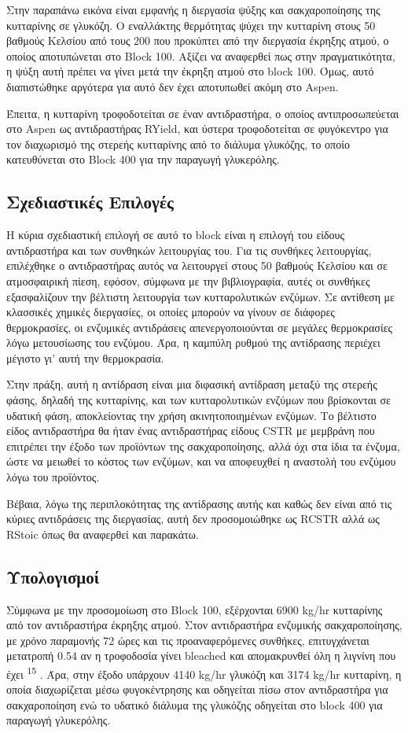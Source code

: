 \documentclass[11pt]{article}
\makeatletter
\newcommand{\citeprocitem}[2]{\hyper@linkstart{cite}{citeproc_bib_item_#1}#2\hyper@linkend}
\makeatother
\begin{document}
Στην παραπάνω εικόνα είναι εμφανής η διεργασία ψύξης και σακχαροποίησης
της κυτταρίνης σε γλυκόζη. Ο εναλλάκτης θερμότητας ψύχει την κυτταρίνη
στους 50 βαθμούς Κελσίου από τους 200 που προκύπτει από την διεργασία
έκρηξης ατμού, ο οποίος αποτυπώνεται στο Block 100. Αξίζει να αναφερθεί πως στην πραγματικότητα, η ψύξη αυτή πρέπει να γίνει μετά την έκρηξη ατμού στο block 100. Όμως, αυτό διαπιστώθηκε αργότερα για αυτό δεν έχει αποτυπωθεί ακόμη στο Aspen.

Έπειτα, η κυτταρίνη τροφοδοτείται σε έναν αντιδραστήρα, ο οποίος αντιπροσωπεύεται στο Aspen ως αντιδραστήρας RYield, και ύστερα τροφοδοτείται σε φυγόκεντρο για τον
διαχωρισμό της στερεής κυτταρίνης από το διάλυμα γλυκόζης, το οποίο
κατευθύνεται στο Block 400 για την παραγωγή γλυκερόλης.

\subsection{Σχεδιαστικές Επιλογές}
\label{sec:orgb4f5268}
Η κύρια σχεδιαστική επιλογή σε αυτό το block είναι η επιλογή του είδους
αντιδραστήρα και των συνθηκών λειτουργίας του. Για τις συνθήκες
λειτουργίας, επιλέχθηκε ο αντιδραστήρας αυτός να λειτουργεί στους 50
βαθμούς Κελσίου και σε ατμοσφαιρική πίεση, εφόσον, σύμφωνα με την
βιβλιογραφία, αυτές οι συνθήκες εξασφαλίζουν την βέλτιστη λειτουργία των
κυτταρολυτικών ενζύμων. Σε αντίθεση με κλασσικές χημικές διεργασίες, οι
οποίες μπορούν να γίνουν σε διάφορες θερμοκρασίες, οι ενζυμικές
αντιδράσεις απενεργοποιούνται σε μεγάλες θερμοκρασίες λόγω μετουσίωσης
του ενζύμου. Άρα, η καμπύλη ρυθμού της αντίδρασης περιέχει μέγιστο γι'
αυτή την θερμοκρασία.

Στην πράξη, αυτή η αντίδραση είναι μια διφασική αντίδραση μεταξύ της
στερεής φάσης, δηλαδή της κυτταρίνης, και των κυτταρολυτικών ενζύμων που
βρίσκονται σε υδατική φάση, αποκλείοντας την χρήση ακινητοποιημένων
ενζύμων. Το βέλτιστο είδος αντιδραστήρα θα ήταν ένας αντιδραστήρας
είδους CSTR με μεμβράνη που επιτρέπει την έξοδο των προϊόντων της
σακχαροποίησης, αλλά όχι στα ίδια τα ένζυμα, ώστε να μειωθεί το κόστος
των ενζύμων, και να αποφευχθεί η αναστολή του ενζύμου λόγω του
προϊόντος.

Βέβαια, λόγω της περιπλοκότητας της αντίδρασης αυτής και καθώς δεν είναι από τις κύριες αντιδράσεις της διεργασίας, αυτή δεν προσομοιώθηκε ως RCSTR αλλά ως RStoic όπως θα αναφερθεί και παρακάτω.

\subsection{Υπολογισμοί}
\label{sec:org6f2a4ab}
Σύμφωνα με την προσομοίωση στο Block 100, εξέρχονται 6900 kg/hr
κυτταρίνης από τον αντιδραστήρα έκρηξης ατμού. Στον αντιδραστήρα
ενζυμικής σακχαροποίησης, με χρόνο παραμονής 72 ώρες και τις προαναφερόμενες συνθήκες, επιτυγχάνεται μετατροπή 0.54 αν η τροφοδοσία γίνει bleached και απομακρυνθεί όλη η λιγνίνη που έχει \textsuperscript{\citeprocitem{15}{15}} . Άρα, στην έξοδο
υπάρχουν 4140 kg/hr γλυκόζη και 3174 kg/hr κυτταρίνη, η οποία διαχωρίζεται
μέσω φυγοκέντρησης και οδηγείται πίσω στον αντιδραστήρα για
σακχαροποίηση ενώ το υδατικό διάλυμα της γλυκόζης οδηγείται στο block 400 για παραγωγή γλυκερόλης.
\end{document}
